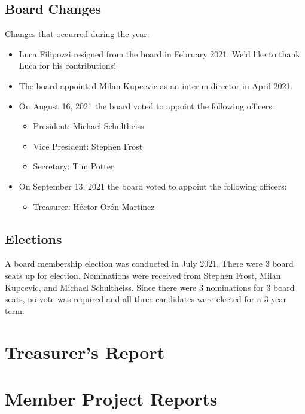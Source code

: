 \documentclass[a4paper]{report}
\begin{document}
\section{Board Changes}

Changes that occurred during the year:

\begin{itemize}

\item Luca Filipozzi resigned from the board in February 2021.  We'd like to thank Luca for his contributions!

\item The board appointed Milan Kupcevic as an interim director in April 2021.

\item On August 16, 2021 the board voted to appoint the following officers:

\begin{itemize}
\item President: Michael Schultheiss
\item Vice President: Stephen Frost
\item Secretary: Tim Potter
\end{itemize}

\item On September 13, 2021 the board voted to appoint the following officers:

\begin{itemize}
\item Treasurer: Héctor Orón Martínez
\end{itemize}

\end{itemize}

\section{Elections}

A board membership election was conducted in July 2021.  There were 3 board seats up for election.  Nominations were received from Stephen Frost, Milan Kupcevic, and Michael Schultheiss.  Since there were 3 nominations for 3 board seats, no vote was required and all three candidates were elected for a 3 year term.

\chapter{Treasurer's Report}

\chapter{Member Project Reports}
\end{document}
